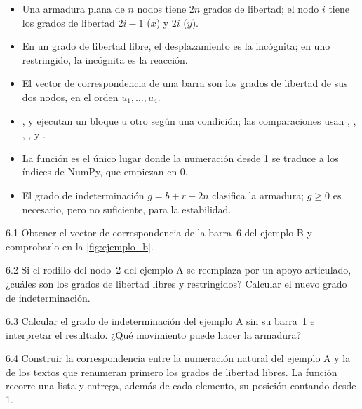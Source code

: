 \begin{itemize}
  \item Una armadura plana de $n$ nodos tiene $2n$ grados de libertad; el
    nodo $i$ tiene los grados de libertad $2i-1$ ($x$) y $2i$ ($y$).
  \item En un grado de libertad libre, el desplazamiento es la incógnita; en
    uno restringido, la incógnita es la reacción.
  \item El vector de correspondencia de una barra son los grados de libertad
    de sus dos nodos, en el orden $u_1, \dots, u_4$.
  \item {},  y  ejecutan un bloque u otro según una
    condición; las comparaciones usan \py{==}, \py{!=}, \py{<}, \py{>},
    \py{<=} y \py{>=}.
  \item La función  es el único lugar donde la numeración desde 1
    se traduce a los índices de NumPy, que empiezan en 0.
  \item El grado de indeterminación $g = b + r - 2n$ clasifica la armadura;
    $g \geq 0$ es necesario, pero no suficiente, para la estabilidad.
\end{itemize}

\ejercicios

\begin{ejercicio}{6.1}
Obtener el vector de correspondencia de la barra~6 del ejemplo B y
comprobarlo en la \cref{fig:ejemplo_b}.
\end{ejercicio}

\begin{ejercicio}{6.2}
Si el rodillo del nodo~2 del ejemplo A se reemplaza por un apoyo articulado,
¿cuáles son los grados de libertad libres y restringidos? Calcular el nuevo
grado de indeterminación.
\end{ejercicio}

\begin{ejercicio}{6.3}
Calcular el grado de indeterminación del ejemplo A sin su barra~1 e
interpretar el resultado. ¿Qué movimiento puede hacer la armadura?
\end{ejercicio}

\begin{ejercicio}{6.4}
Construir la correspondencia entre la numeración natural del ejemplo A y la
de los textos que renumeran primero los grados de libertad libres. La función
 recorre una lista y entrega, además de cada elemento,
su posición contando desde 1.
\end{ejercicio}

